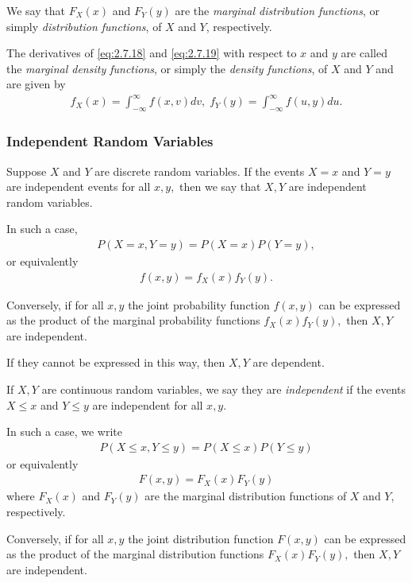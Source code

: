   We say that $F_{X}(x)$ and $F_{Y}(y)$ are the \emph{marginal distribution functions}, or simply \emph{distribution functions}, of $X$ and $Y$, respectively.

  The derivatives of \eqref{eq:2.7.18} and \eqref{eq:2.7.19} with respect to $x$ and $y$ are called the \emph{marginal density functions}, or simply the \emph{density functions}, of $X$ and $Y$ and are given by
  \begin{align}
  \label{eq:2.7.20}
  \displaystyle
   f_{X}(x)=\int_{-\infty}^{\infty}f(x,v)dv, \;
   f_{Y}(y)=\int_{-\infty}^{\infty}f(u,y)du.
  \end{align}

 \subsubsection{Independent Random Variables}

  Suppose $X$ and $Y$ are discrete random variables. If the events $X=x$ and $Y=y$ are independent events for all $x,y,$ then we say that $X,Y$ are independent random variables.

  In such a case,
  \begin{align}
   \label{eq:2.7.21}
   P(X=x,Y=y)=P(X=x)P(Y=y),
  \end{align}
or equivalently
\begin{align}
 f(x,y)=f_{X}(x)f_{Y}(y).
\end{align}

  Conversely, if for all $x,y$ the joint probability function $f(x,y)$ can be expressed as the product of the marginal probability functions $f_{X}(x)f_{Y}(y),$ then $X,Y$ are independent.

  If they cannot be expressed in this way, then $X,Y$ are dependent.

  If $X,Y$ are continuous random variables, we say they are \emph{independent} if the events $X\leq x$ and $Y\leq y$ are independent for all $x,y.$

  In such a case, we write
  \begin{align}
   \label{eq:2.7.22}
   P(X\leq x, Y \leq y)=P(X\leq x)P(Y\leq y)
  \end{align}
  or equivalently
  \begin{align}
   F(x,y)=F_{X}(x)F_{Y}(y)
  \end{align}
  where $F_{X}(x)$ and $F_{Y}(y)$ are the marginal distribution functions of $X$ and $Y$, respectively.

  Conversely, if for all $x,y$ the joint distribution function $F(x,y)$ can be expressed as the product of the marginal distribution functions $F_{X}(x)F_{Y}(y),$ then $X,Y$ are independent.
  
